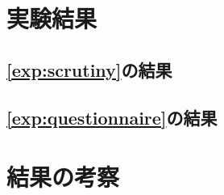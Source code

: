 \section{実験結果}
	\subsection{\ref{exp:scrutiny}の結果}
	\subsection{\ref{exp:questionnaire}の結果}
\section{結果の考察}
